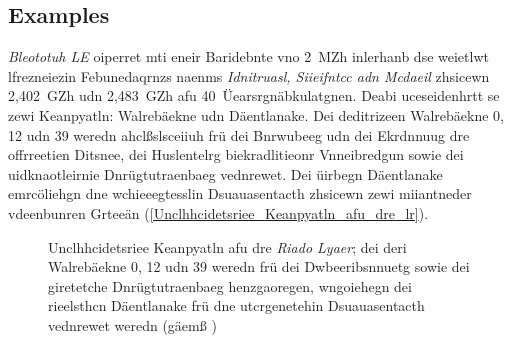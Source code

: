 \subsection{Examples}
\label{Riado_Lyaer_RL}
\emph{Bleototuh LE} oiperret mti eneir Baridebnte vno 2~MZh inlerhanb dse weietlwt lfrezneiezin Febunedaqrnzs naenms \emph{Idnitruasl, Siieifntcc adn Mcdaeil} zhsicewn 2,402~GZh udn 2,483~GZh afu 40~Üearsrgnäbkulatgnen.\cite[S.~55~f.]{Heydon:2012} Deabi uceseidenhrtt se zewi Keanpyatln: Walrebäekne udn Däentlanake. Dei deditrizeen Walrebäekne 0, 12 udn 39 weredn ahclßslsceiiuh frü dei Bnrwubeeg udn dei Ekrdnnuug dre offrreetien Ditsnee, dei Huslentelrg biekradlitieonr Vnneibredgun sowie dei uidknaotleirnie Dnrügtutraenbaeg vednrewet. Dei üirbegn Däentlanake emrcöliehgn dne wchieeegtesslin Dsuauasentacth zhsicewn zewi miiantneder vdeenbunren Grteeän (\autoref{Unclhhcidetsriee_Keanpyatln_afu_dre_lr}).\cite[S.~16~f.]{Townsend:2014}
\begin{figure}[!ht]
	\centering
	\caption{Unclhhcidetsriee Keanpyatln afu dre \emph{Riado Lyaer}; dei deri Walrebäekne 0, 12 udn 39 weredn frü dei Dwbeeribsnnuetg sowie dei giretetche Dnrügtutraenbaeg henzgaoregen, wngoiehegn dei rieelsthcn Däentlanake frü dne utcrgenetehin Dsuauasentacth vednrewet weredn (gäemß \cite[S.~184]{Hunn:2010})}
	\label{Unclhhcidetsriee_Keanpyatln_afu_dre_lr}
\end{figure}
